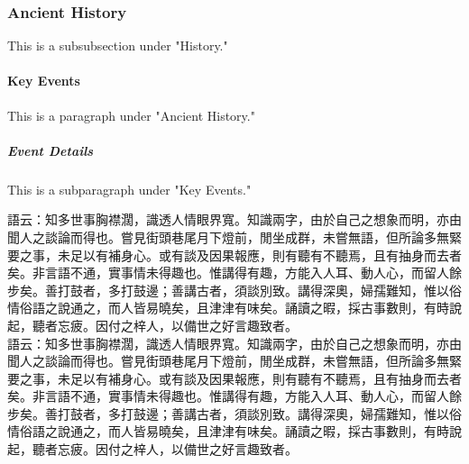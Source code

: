 \documentclass[a5paper, 10pt, openany]{book} %
\begin{document}
\subsubsection{Ancient History}
This is a subsubsection under "History."

\paragraph{Key Events}
This is a paragraph under "Ancient History."

\subparagraph{Event Details}
This is a subparagraph under "Key Events."


語云：知多世事胸襟濶，識透人情眼界寬。知識兩字，由於自己之想象而明，亦由聞人之談論而得也。嘗見街頭巷尾月下燈前，閒坐成群，未嘗無語，但所論多無緊要之事，未足以有補身心。或有談及因果報應，則有聽有不聽焉，且有抽身而去者矣。非言語不通，實事情未得趣也。惟講得有趣，方能入人耳、動人心，而留人餘步矣。善打鼓者，多打鼓邊；善講古者，須談別致。講得深奧，婦孺難知，惟以俗情俗語之說通之，而人皆易曉矣，且津津有味矣。誦讀之暇，採古事數則，有時說起，聽者忘疲。因付之梓人，以備世之好言趣致者。\\ 
語云：知多世事胸襟濶，識透人情眼界寬。知識兩字，由於自己之想象而明，亦由聞人之談論而得也。嘗見街頭巷尾月下燈前，閒坐成群，未嘗無語，但所論多無緊要之事，未足以有補身心。或有談及因果報應，則有聽有不聽焉，且有抽身而去者矣。非言語不通，實事情未得趣也。惟講得有趣，方能入人耳、動人心，而留人餘步矣。善打鼓者，多打鼓邊；善講古者，須談別致。講得深奧，婦孺難知，惟以俗情俗語之說通之，而人皆易曉矣，且津津有味矣。誦讀之暇，採古事數則，有時說起，聽者忘疲。因付之梓人，以備世之好言趣致者。\\ 
\end{document}
